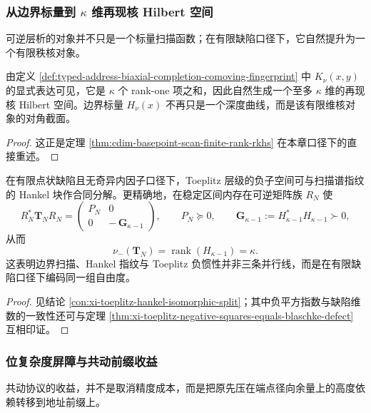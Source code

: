 \subsubsection{从边界标量到 \texorpdfstring{$\kappa$}{kappa} 维再现核 Hilbert 空间}\label{subsubsec:typed-address-biaxial-completion-comoving-rkhs}
可逆层析的对象并不只是一个标量扫描函数；在有限缺陷口径下，它自然提升为一个有限秩核对象。

\begin{theorem}\label{thm:typed-address-biaxial-completion-comoving-rkhs}
由定义 \ref{def:typed-address-biaxial-completion-comoving-fingerprint} 中 \(K_\nu(x,y)\) 的显式表达可见，它是 \(\kappa\) 个 rank-one 项之和，因此自然生成一个至多 \(\kappa\) 维的再现核 Hilbert 空间。边界标量 \(H_\nu(x)\) 不再只是一个深度曲线，而是该有限维核对象的对角截面。
\end{theorem}
\begin{proof}
这正是定理 \ref{thm:cdim-basepoint-scan-finite-rank-rkhs} 在本章口径下的直接重述。
\end{proof}

\begin{proposition}\label{prop:typed-address-biaxial-completion-comoving-toeplitz-hankel}
在有限点状缺陷且无奇异内因子口径下，Toeplitz 层级的负子空间可与扫描谱指纹的 Hankel 块作合同分解。更精确地，在稳定区间内存在可逆矩阵族 \(R_N\) 使
\[
R_N^{\ast}\mathbf{T}_N R_N
=
\begin{pmatrix}
P_N & 0\\
0 & -\,\mathbf{G}_{\kappa-1}
\end{pmatrix},
\qquad
P_N\succeq 0,
\qquad
\mathbf{G}_{\kappa-1}:=H_{\kappa-1}^{\ast}H_{\kappa-1}\succ 0,
\]
从而
\[
\nu_-(\mathbf{T}_N)=\operatorname{rank}(H_{\kappa-1})=\kappa.
\]
这表明边界扫描、Hankel 指纹与 Toeplitz 负惯性并非三条并行线，而是在有限缺陷口径下编码同一组自由度。
\end{proposition}
\begin{proof}
见结论 \ref{con:xi-toeplitz-hankel-isomorphic-split}；其中负平方指数与缺陷维数的一致性还可与定理 \ref{thm:xi-toeplitz-negative-squares-equals-blaschke-defect} 互相印证。
\end{proof}

\subsubsection{位复杂度屏障与共动前缀收益}\label{subsubsec:typed-address-biaxial-completion-comoving-bit-budget}
共动协议的收益，并不是取消精度成本，而是把原先压在端点径向余量上的高度依赖转移到地址前缀上。

